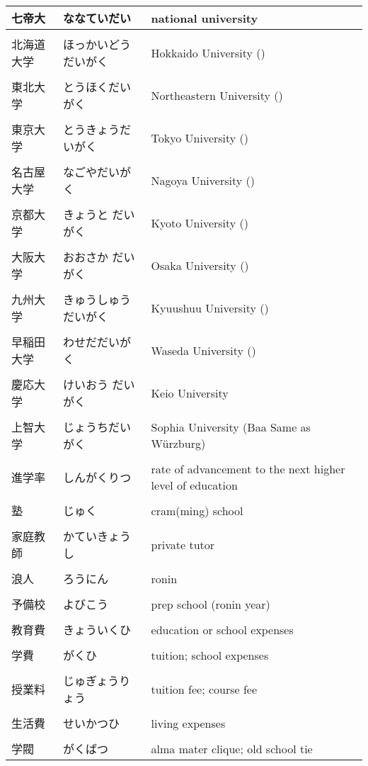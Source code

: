\documentclass{article}
\begin{document}
\begin{tabular}{ l | p{6.7cm} | p{7.5cm} }
七帝大 &   ななていだい & national university  \\ \hline \\[-1em]
北海道大学 & ほっかいどうだいがく & Hokkaido University ()\\ \hline \\[-1em]
東北大学 &  とうほくだいがく  & Northeastern University ()\\ \hline \\[-1em]
東京大学 & とうきょうだいがく & Tokyo University ()\\ \hline \\[-1em]
名古屋大学 &  なごやだいがく & Nagoya University ()\\ \hline \\[-1em]
京都大学 &  きょうと だいがく& Kyoto University ()\\ \hline \\[-1em]
大阪大学 &  おおさか だいがく& Osaka University ()\\ \hline \\[-1em]
九州大学 &  きゅうしゅうだいがく& Kyuushuu University ()\\ \hline \\[-1em]
早稲田大学 & わせだだいがく& Waseda University ()\\ \hline \\[-1em]
慶応大学 &  けいおう だいがく& Keio University \\ \hline \\[-1em]
上智大学 &  じょうちだいがく& Sophia University (Baa {Same as Würzburg})\\ \hline \\[-1em]
進学率 &  しんがくりつ  & rate of advancement to the next higher level of education\\ \hline \\[-1em]
塾 & じゅく &  cram(ming) school \\ \hline \\[-1em]
家庭教師 &  かていきょうし  & private tutor\\ \hline \\[-1em]
浪人 &  ろうにん & ronin \\ \hline \\[-1em]
予備校 &  よびこう & prep school (ronin year) \\ \hline \\[-1em]
教育費 &  きょういくひ & education or school expenses\\ \hline \\[-1em]
学費  &  がくひ & tuition; school expenses\\ \hline \\[-1em]
授業料 &  じゅぎょうりょう & tuition fee; course fee\\ \hline \\[-1em]
生活費 &  せいかつひ & living expenses \\ \hline \\[-1em]
学閥 &  がくばつ & alma mater clique; old school tie %
\end{tabular}
\end{document}
